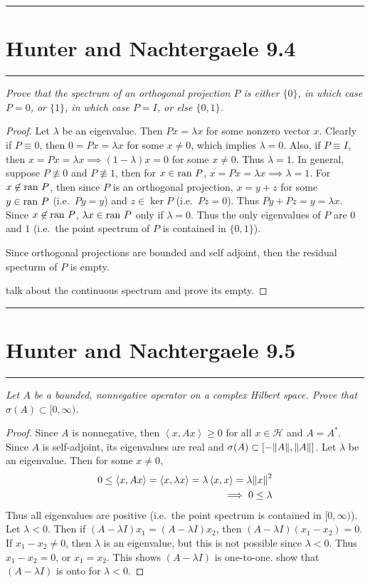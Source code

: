 \documentclass{article} %
\theoremstyle{plain}
\newcommand{\VEC}[2]{\left\langle #1, #2 \right\rangle}
\newcommand{\ran}{\text{\rm ran }}
\newcommand{\Hilb}{\mathcal{H}}
\newcommand{\problem}[1]{
\vspace{.375cm}
\begin{minipage}{\textwidth}
    \begin{center}
        \noindent\rule{5cm}{1pt}
    \end{center}
    \section{\bf #1}
    \begin{center}
        \noindent\rule{5cm}{1pt}
    \end{center}
    \vspace{0.25cm}
\end{minipage}
}
\numberwithin{equation}{section} %
\numberwithin{figure}{section} %
\numberwithin{table}{section} %
\begin{document}
\problem{Hunter and Nachtergaele 9.4}
\emph{Prove that the spectrum of an orthogonal projection $P$ is either $\{0\}$, in which case $P = 0$, or $\{1\}$, in which case $P = I$, or else $\{0,1\}$.}
\begin{proof}
    Let $\lambda$ be an eigenvalue.  Then $Px = \lambda x$ for some nonzero vector $x$.  Clearly if $P \equiv 0$, then $0 = Px = \lambda x$ for some $x \neq 0$, which implies $\lambda = 0$.  Also, if $P \equiv I$, then $x = Px = \lambda x \implies (1 - \lambda)x = 0$ for some $x \neq 0$.  Thus $\lambda = 1$.  In general, suppose $P \not\equiv 0$ and $P \not\equiv 1$, then for $x \in \ran P$, $x = Px = \lambda x \implies \lambda = 1$.  For $x \not\in \ran P$, then since $P$ is an orthogonal projection, $x = y + z$ for some $y \in \ran P$ (i.e.~$Py = y$) and $z \in \ker P$ (i.e.~$Pz = 0$).  Thus $Py + Pz = y = \lambda x$.  Since $x \not\in \ran P$, $\lambda x \in \ran P$ only if $\lambda = 0$.  Thus the only eigenvalues of $P$ are $0$ and $1$ (i.e.~the point spectrum of $P$ is contained in $\{0,1\}$).

    Since orthogonal projections are bounded and self adjoint, then the residual specturm of $P$ is empty.

    {\color{red} talk about the continuous spectrum and prove its empty.}
\end{proof}









\problem{Hunter and Nachtergaele 9.5}
\emph{Let $A$ be a bounded, nonnegative operator on a complex Hilbert space.  Prove that $\sigma(A) \subset [0, \infty)$.}
\begin{proof}
    Since $A$ is nonnegative, then $\VEC{x}{Ax} \geq 0$ for all $x \in \Hilb$ and $A = A^*$.  Since $A$ is self-adjoint, its eigenvalues are real and $\sigma(A) \subset \qty[-\norm{A}, \norm{A}]$.  Let $\lambda$ be an eigenvalue.  Then for some $x \neq 0$,
    \begin{align*}
        0 \leq \VEC{x}{Ax} = \VEC{x}{\lambda x} = \lambda \VEC{x}{x} = \lambda \norm{x}^2 \\
        \implies 0 \leq \lambda
    \end{align*}
    Thus all eigenvalues are positive (i.e.~the point spectrum is contained in $[0, \infty)$).  Let $\lambda < 0$.  Then if $(A - \lambda I)x_1 = (A - \lambda I)x_2$, then $(A - \lambda I)(x_1 - x_2) = 0$.  If $x_1 - x_2 \neq 0$, then $\lambda$ is an eigenvalue, but this is not possible since $\lambda < 0$.  Thus $x_1 - x_2 = 0$, or $x_1 = x_2$.  This shows $(A - \lambda I)$ is one-to-one.
    {\color{red} show that $(A - \lambda I)$ is onto for $\lambda < 0$.}
\end{proof}
\end{document}
